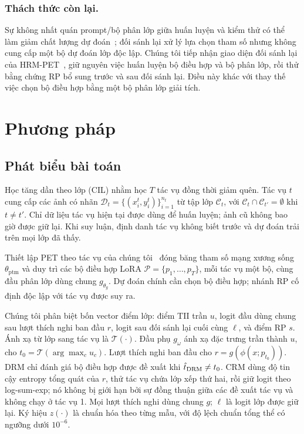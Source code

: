 \documentclass[runningheads]{llncs}
\begin{document}
\subsubsection{Thách thức còn lại.}
Sự không nhất quán prompt/bộ phân lớp giữa huấn luyện và kiểm thử có thể làm
giảm chất lượng dự đoán~\cite{ref_cprompt}; đối sánh lại xử lý lựa chọn tham số
nhưng không cung cấp một bộ dự đoán lớp độc lập. Chúng tôi tiếp nhận giao diện
đối sánh lại của HRM-PET~\cite{ref_hrmpet}, giữ nguyên việc huấn luyện bộ điều
hợp và bộ phân lớp, rồi thử bằng chứng RP bổ sung trước và sau đối sánh lại.
Điều này khác với thay thế việc chọn bộ điều hợp bằng một bộ phân lớp giải tích.

\section{Phương pháp}
\label{sec:method}

\subsection{Phát biểu bài toán}

Học tăng dần theo lớp (CIL) nhằm học $T$ tác vụ đồng thời giảm quên. Tác vụ
$t$ cung cấp các ảnh có nhãn
$\mathcal D_t=\{(x_i^t,y_i^t)\}_{i=1}^{n_t}$ từ tập lớp $\mathcal C_t$,
với $\mathcal C_t\cap\mathcal C_{t'}=\emptyset$ khi $t\ne t'$. Chỉ dữ liệu
tác vụ hiện tại được dùng để huấn luyện; ảnh cũ không bao giờ được giữ lại.
Khi suy luận, định danh tác vụ không biết trước và dự đoán trải trên mọi lớp
đã thấy.

Thiết lập PET theo tác vụ của chúng tôi~\cite{ref_hide,ref_hrmpet} đóng băng
tham số mạng xương sống $\theta_{\mathrm{ptm}}$ và duy trì các bộ điều hợp LoRA
$\mathcal P=\{p_1,\dots,p_T\}$, mỗi tác vụ một bộ, cùng đầu phân lớp dùng chung
$g_{\theta_g}$. Dự đoán chính cần chọn bộ điều hợp; nhánh RP cố định độc lập với
tác vụ được suy ra.

Chúng tôi phân biệt bốn vector điểm lớp: điểm TII trần $u$, logit đầu dùng chung
sau lượt thích nghi ban đầu $r$, logit sau đối sánh lại cuối cùng $\ell$, và
điểm RP $s$. Ánh xạ từ lớp sang tác vụ là $\mathcal T(\cdot)$. Đầu phụ
$g_\omega$ ánh xạ đặc trưng trần thành $u$, cho
$t_0=\mathcal T(\arg\max_c u_c)$. Lượt thích nghi ban đầu cho
$r=g(\phi(x;p_{t_0}))$. DRM chỉ đánh giá bộ điều hợp được đề xuất khi
$\hat t_{\rm DRM}\ne t_0$. CRM dùng độ tin cậy entropy tổng quát của $r$, thử
tác vụ chứa lớp xếp thứ hai, rồi giữ logit theo log-sum-exp; nó không bị giới
hạn bởi sự đồng thuận giữa các đề xuất tác vụ và không chạy ở tác vụ 1. Mọi
lượt thích nghi dùng chung $g$; $\ell$ là logit lớp được giữ lại. Ký hiệu
$z(\cdot)$ là chuẩn hóa theo từng mẫu, với độ lệch chuẩn tổng thể có ngưỡng dưới
$10^{-6}$.
\end{document}
